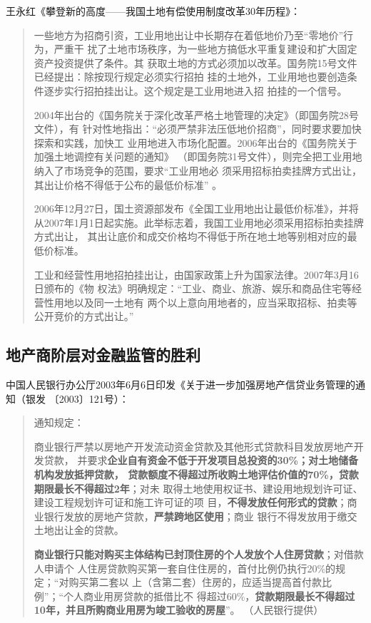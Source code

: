 王永红《攀登新的高度——我国土地有偿使用制度改革30年历程》：
\begin{quotation}
一些地方为招商引资，工业用地出让中长期存在着低地价乃至“零地价”行为，严重干
扰了土地市场秩序，为一些地方搞低水平重复建设和扩大固定资产投资提供了条件。其
获取土地的方式必须加以改革。国务院15号文件已经提出：除按现行规定必须实行招拍
挂的土地外，工业用地也要创造条件逐步实行招拍挂出让。这个规定是工业用地进入招
拍挂的一个信号。

2004年出台的《国务院关于深化改革严格土地管理的决定》（即国务院28号文件），有
针对性地指出：“必须严禁非法压低地价招商”，同时要求要加快探索和实践，加快工
业用地进入市场化配置。2006年出台的《国务院关于加强土地调控有关问题的通知》
（即国务院31号文件），则完全把工业用地纳入了市场竞争的范围，要求“工业用地必
须采用招标拍卖挂牌方式出让，其出让价格不得低于公布的最低价标准” 。

2006年12月27日，国土资源部发布《全国工业用地出让最低价标准》，并将
从2007年1月1日起实施。此举标志着，我国工业用地必须采用招标拍卖挂牌方式出让，
其出让底价和成交价格均不得低于所在地土地等别相对应的最低价标准。

工业和经营性用地招拍挂出让，由国家政策上升为国家法律。2007年3月16日颁布的《物
权法》明确规定：“工业、商业、旅游、娱乐和商品住宅等经营性用地以及同一土地有
两个以上意向用地者的，应当采取招标、拍卖等公开竞价的方式出让。”
\end{quotation}

\subsection{地产商阶层对金融监管的胜利}

中国人民银行办公厅2003年6月6日印发《关于进一步加强房地产信贷业务管理的通知（银发
〔2003〕121号）：
\begin{quotation}
  通知规定：

  商业银行严禁以房地产开发流动资金贷款及其他形式贷款科目发放房地产开发贷款，
  并要求\textbf{企业自有资金不低于开发项目总投资的30\%；对土地储备机构发放抵押贷款，
    贷款额度不得超过所收购土地评估价值的70\%，贷款期限最长不得超过2年}；对未
  取得土地使用权证书、建设用地规划许可证、建设工程规划许可证和施工许可证的项
  目，\textbf{不得发放任何形式的贷款}；商业银行发放的房地产贷款，\textbf{严禁跨地区使用}；商业
  银行不得发放用于缴交土地出让金的贷款。

  \textbf{商业银行只能对购买主体结构已封顶住房的个人发放个人住房贷款}；对借款人申请个
  人住房贷款购买第一套自住住房的，首付比例仍执行20\%的规定；“对购买第二套以
  上（含第二套）住房的，应适当提高首付款比例”；“个人商业用房贷款的抵借比不
  得超过60\%，\textbf{贷款期限最长不得超过10年，并且所购商业用房为竣工验收的房屋}”。
  （人民银行提供）
\end{quotation}

